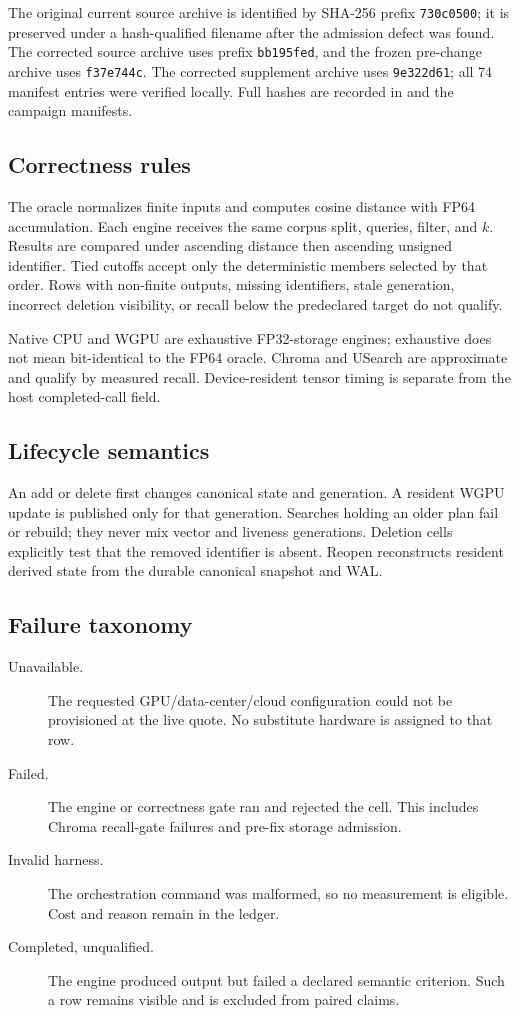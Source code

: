 The original current source archive is identified by SHA-256 prefix \texttt{730c0500}; it is preserved under a hash-qualified filename after the admission defect was found. The corrected source archive uses prefix \texttt{bb195fed}, and the frozen pre-change archive uses \texttt{f37e744c}. The corrected supplement archive uses \texttt{9e322d61}; all 74 manifest entries were verified locally. Full hashes are recorded in  and the campaign manifests.

\subsection{Correctness rules}
The oracle normalizes finite inputs and computes cosine distance with FP64 accumulation. Each engine receives the same corpus split, queries, filter, and \(k\). Results are compared under ascending distance then ascending unsigned identifier. Tied cutoffs accept only the deterministic members selected by that order. Rows with non-finite outputs, missing identifiers, stale generation, incorrect deletion visibility, or recall below the predeclared target do not qualify.

Native CPU and WGPU are exhaustive FP32-storage engines; exhaustive does not mean bit-identical to the FP64 oracle. Chroma and USearch are approximate and qualify by measured recall. Device-resident tensor timing is separate from the host completed-call field.

\subsection{Lifecycle semantics}
An add or delete first changes canonical state and generation. A resident WGPU update is published only for that generation. Searches holding an older plan fail or rebuild; they never mix vector and liveness generations. Deletion cells explicitly test that the removed identifier is absent. Reopen reconstructs resident derived state from the durable canonical snapshot and WAL.

\subsection{Failure taxonomy}
\begin{description}
\item[Unavailable.] The requested GPU/data-center/cloud configuration could not be provisioned at the live quote. No substitute hardware is assigned to that row.
\item[Failed.] The engine or correctness gate ran and rejected the cell. This includes Chroma recall-gate failures and pre-fix storage admission.
\item[Invalid harness.] The orchestration command was malformed, so no measurement is eligible. Cost and reason remain in the ledger.
\item[Completed, unqualified.] The engine produced output but failed a declared semantic criterion. Such a row remains visible and is excluded from paired claims.
\end{description}

